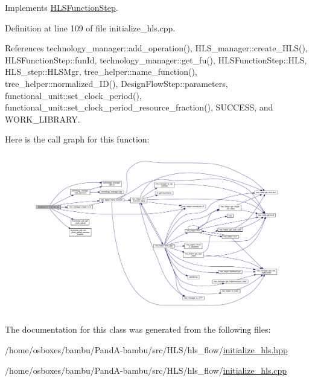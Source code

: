 Implements \hyperlink{classHLSFunctionStep_a8db4c00d080655984d98143206fc9fa8}{H\+L\+S\+Function\+Step}.



Definition at line 109 of file initialize\+\_\+hls.\+cpp.



References technology\+\_\+manager\+::add\+\_\+operation(), H\+L\+S\+\_\+manager\+::create\+\_\+\+H\+L\+S(), H\+L\+S\+Function\+Step\+::fun\+Id, technology\+\_\+manager\+::get\+\_\+fu(), H\+L\+S\+Function\+Step\+::\+H\+LS, H\+L\+S\+\_\+step\+::\+H\+L\+S\+Mgr, tree\+\_\+helper\+::name\+\_\+function(), tree\+\_\+helper\+::normalized\+\_\+\+I\+D(), Design\+Flow\+Step\+::parameters, functional\+\_\+unit\+::set\+\_\+clock\+\_\+period(), functional\+\_\+unit\+::set\+\_\+clock\+\_\+period\+\_\+resource\+\_\+fraction(), S\+U\+C\+C\+E\+SS, and W\+O\+R\+K\+\_\+\+L\+I\+B\+R\+A\+RY.

Here is the call graph for this function\+:
\nopagebreak
\begin{figure}[H]
\begin{center}
\leavevmode
\includegraphics[width=350pt]{d1/dad/classInitializeHLS_abb4fa19e0a7910383cb1837ee6e6a1e5_cgraph}
\end{center}
\end{figure}


The documentation for this class was generated from the following files\+:\begin{DoxyCompactItemize}
\item 
/home/osboxes/bambu/\+Pand\+A-\/bambu/src/\+H\+L\+S/hls\+\_\+flow/\hyperlink{initialize__hls_8hpp}{initialize\+\_\+hls.\+hpp}\item 
/home/osboxes/bambu/\+Pand\+A-\/bambu/src/\+H\+L\+S/hls\+\_\+flow/\hyperlink{initialize__hls_8cpp}{initialize\+\_\+hls.\+cpp}\end{DoxyCompactItemize}
